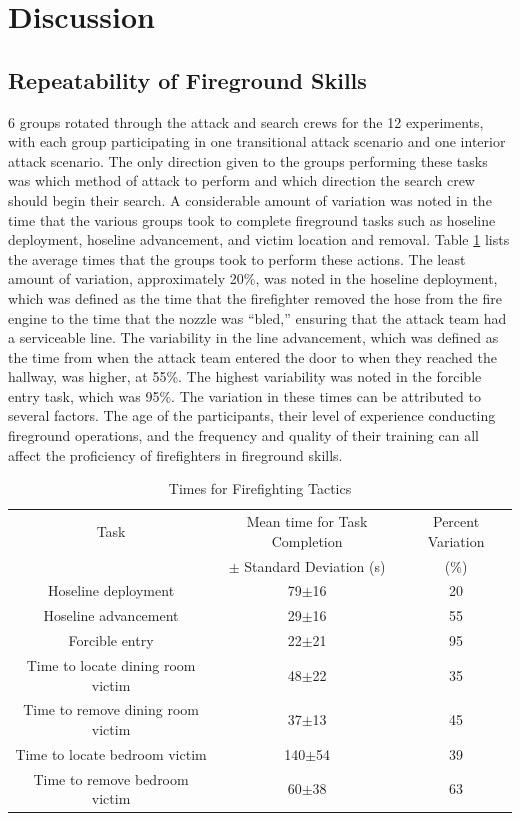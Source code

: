 \documentclass[12pt,oneside]{article}
\begin{document}
\section{Discussion}

\subsection{Repeatability of Fireground Skills}
\label{subsec:ff_repeatability}
 6 groups rotated through the attack and search crews for the 12 experiments, with each group participating in one transitional attack scenario and one interior attack scenario. The only direction given to the groups performing these tasks was which method of attack to perform and which direction the search crew should begin their search. A considerable amount of variation was noted in the time that the various groups took to complete fireground tasks such as hoseline deployment, hoseline advancement, and victim location and removal. Table \ref{tab:ff_tasks} lists the average times that the groups took to perform these actions. The least amount of variation, approximately 20\%, was noted in the hoseline deployment, which was defined as the time that the firefighter removed the hose from the fire engine to the time that the nozzle was ``bled,'' ensuring that the attack team had a serviceable line. The variability in the line advancement, which was defined as the time from when the attack team entered the door to when they reached the hallway, was higher, at 55\%. The highest variability was noted in the forcible entry task, which was  95\%. The variation in these times can be attributed to several factors. The age of the participants, their level of experience conducting fireground operations, and the frequency and quality of their training can all affect the proficiency of firefighters in fireground skills. 

\begin{table}[!ht]
    \centering
    \caption{Times for Firefighting Tactics}
    \label{tab:ff_tasks}
    \begin{tabular}{ccc}
    \toprule[1.5pt]
 	Task&								Mean time for Task Completion  &Percent Variation\\
 		&								$\pm$ Standard Deviation (s)&			(\%)		\\
 	\midrule 
  	Hoseline deployment					&	79$\pm$16	&	20\\
  	Hoseline advancement				&	29$\pm$16	&	55\\
  	Forcible entry						&	22$\pm$21	&	95\\
  	Time to locate dining room victim 	&	48$\pm$22	&	35\\
  	Time to remove dining room victim 	&	37$\pm$13	&	45\\
  	Time to locate bedroom victim 		&	140$\pm$54	&	39\\
  	Time to remove bedroom victim 		&	60$\pm$38	&	63\\  	
 	\bottomrule[1.25pt] 
    \end{tabular}
\end{table}
\end{document}
